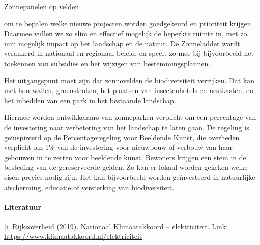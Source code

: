 \begin{voorstel}{Zonnepanelen op velden}
\begin{multicols}{2}
\begin{overwegingen}

\end{overwegingen}

\begin{aanbevelingen}
om te bepalen welke nieuwe projecten worden goedgekeurd en prioriteit krijgen. Daarmee vullen we zo slim en effectief mogelijk de beperkte ruimte in, met zo min mogelijk impact op het landschap en de natuur. De Zonneladder wordt verankerd in nationaal en regionaal beleid, en speelt zo mee bij bijvoorbeeld het toekennen van subsidies en het wijzigen van bestemmingsplannen.

Het uitgangspunt moet zijn dat zonnevelden de biodiversiteit verrijken. Dat kan met houtwallen, groenstroken, het plaatsen van insectenhotels en nestkasten, en het inbedden van een park in het bestaande landschap.

Hiermee worden ontwikkelaars van zonneparken verplicht om een percentage van de investering naar verbetering van het landschap te laten gaan. De regeling is geïnspireerd op de Percentageregeling voor Beeldende Kunst, die overheden verplicht om 1\% van de investering voor nieuwbouw of verbouw van haar gebouwen in te zetten voor beeldende kunst.
Bewoners krijgen een stem in de besteding van de gereserveerde gelden.
Zo kan er lokaal worden gekeken welke eisen precies nodig zijn.
Het kan bijvoorbeeld worden geïnvesteerd in natuurlijke afscherming, educatie of versterking van biodiversiteit.

\end{aanbevelingen}


\paragraph{Literatuur}
[i] Rijksoverheid (2019). Nationaal Klimaatakkoord – elektriciteit. Link: \url{https://www.klimaatakkoord.nl/elektriciteit}


\end{multicols}
\end{voorstel}
